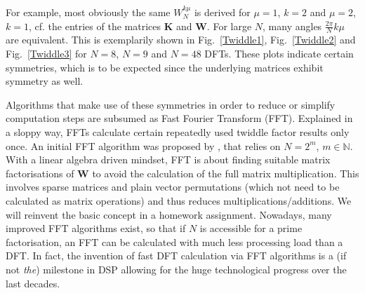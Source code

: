 \documentclass[11pt,a4paper,DIV=12]{scrartcl}
\begin{document}
For example, most obviously the same $W_N^{k\mu}$ is derived for $\mu=1$, $k=2$
and $\mu=2$, $k=1$, cf. the entries of the matrices $\mathbf{K}$ and $\mathbf{W}$.
%
For large $N$, many angles $\frac{2\pi}{N}k\mu$ are equivalent.
%
This is exemplarily shown in Fig.~\ref{Twiddle1}, Fig.~\ref{Twiddle2} and
Fig.~\ref{Twiddle3} for $N=8$, $N=9$ and $N=48$ DFTs.
%
These plots indicate certain symmetries, which is to be expected since the
underlying matrices exhibit symmetry as well.

Algorithms that make use of these symmetries in order to reduce or simplify
computation steps are subsumed as Fast Fourier Transform (FFT).
%
Explained in a sloppy way, FFTs calculate certain repeatedly used twiddle factor
results only once.
%
An initial FFT algorithm was proposed by \cite{Cooley1965},
that relies on $N=2^m$, $m\in\mathbb{N}$.
%
With a linear algebra driven mindset, FFT is about finding
suitable matrix factorisations of $\bm W$ to avoid the calculation of the full
matrix multiplication.
%
This involves sparse matrices and plain
vector permutations (which not need to be calculated as matrix operations) and
thus reduces multiplications/additions.
%
We will reinvent the basic concept in a homework assignment.
%
Nowadays, many improved FFT algorithms exist, so that if $N$
is accessible for a prime factorisation, an FFT can be calculated with much less
processing load than a DFT.
%
In fact, the invention of fast DFT calculation via FFT algorithms
is a (if not \textit{the}) milestone in DSP allowing for the huge
technological progress over the last decades.
\end{document}
